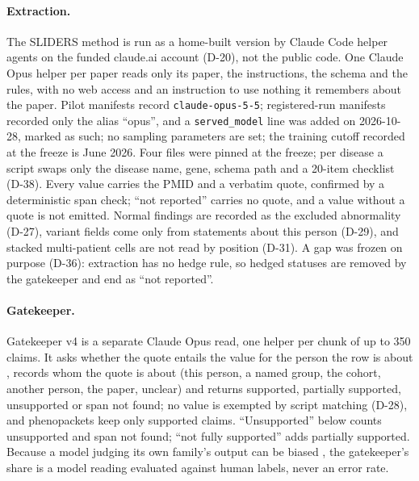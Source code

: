 \documentclass{article} %
\begin{document}
\paragraph{Extraction.} The SLIDERS method \citep{joshi2026_sliders} is run as a home-built version by Claude Code helper agents on the funded claude.ai account (D-20), not the public code. One Claude Opus helper per paper reads only its paper, the instructions, the schema and the rules, with no web access and an instruction to use nothing it remembers about the paper. Pilot manifests record \texttt{claude-opus-5-5}; registered-run manifests recorded only the alias ``opus'', and a \texttt{served\_model} line was added on 2026-10-28, marked as such; no sampling parameters are set; the training cutoff recorded at the freeze is June 2026. Four files were pinned at the freeze; per disease a script swaps only the disease name, gene, schema path and a 20-item checklist (D-38). Every value carries the PMID and a verbatim quote, confirmed by a deterministic span check; ``not reported'' carries no quote, and a value without a quote is not emitted. Normal findings are recorded as the excluded abnormality (D-27), variant fields come only from statements about this person (D-29), and stacked multi-patient cells are not read by position (D-31). A gap was frozen on purpose (D-36): extraction has no hedge rule, so hedged statuses are removed by the gatekeeper and end as ``not reported''.

\paragraph{Gatekeeper.} Gatekeeper v4 is a separate Claude Opus read, one helper per chunk of up to 350 claims. It asks whether the quote entails the value for the person the row is about \citep{rashkin2023_ais}, records whom the quote is about (this person, a named group, the cohort, another person, the paper, unclear) and returns supported, partially supported, unsupported or span not found; no value is exempted by script matching (D-28), and phenopackets keep only supported claims. ``Unsupported'' below counts unsupported and span not found; ``not fully supported'' adds partially supported. Because a model judging its own family's output can be biased \citep{zheng2023_llm_judge}, the gatekeeper's share is a model reading evaluated against human labels, never an error rate.
\end{document}
